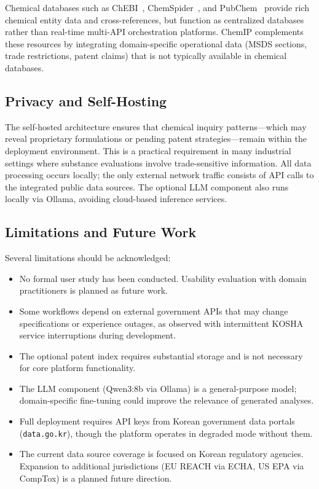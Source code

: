 \documentclass[10pt]{article}
\begin{document}
Chemical databases such as ChEBI~\cite{chebi}, ChemSpider~\cite{chemspider}, and PubChem~\cite{pubchem_2023} provide rich chemical entity data and cross-references, but function as centralized databases rather than real-time multi-API orchestration platforms.
ChemIP complements these resources by integrating domain-specific operational data (MSDS sections, trade restrictions, patent claims) that is not typically available in chemical databases.

\subsection{Privacy and Self-Hosting}

The self-hosted architecture ensures that chemical inquiry patterns---which may reveal proprietary formulations or pending patent strategies---remain within the deployment environment.
This is a practical requirement in many industrial settings where substance evaluations involve trade-sensitive information.
All data processing occurs locally; the only external network traffic consists of API calls to the integrated public data sources.
The optional LLM component also runs locally via Ollama, avoiding cloud-based inference services.

\subsection{Limitations and Future Work}

Several limitations should be acknowledged:
\begin{itemize}[nosep]
  \item No formal user study has been conducted. Usability evaluation with domain practitioners is planned as future work.
  \item Some workflows depend on external government APIs that may change specifications or experience outages, as observed with intermittent KOSHA service interruptions during development.
  \item The optional patent index requires substantial storage and is not necessary for core platform functionality.
  \item The LLM component (Qwen3:8b via Ollama) is a general-purpose model; domain-specific fine-tuning could improve the relevance of generated analyses.
  \item Full deployment requires API keys from Korean government data portals (\texttt{data.go.kr}), though the platform operates in degraded mode without them.
  \item The current data source coverage is focused on Korean regulatory agencies. Expansion to additional jurisdictions (EU REACH via ECHA, US EPA via CompTox) is a planned future direction.
\end{itemize}
\end{document}
